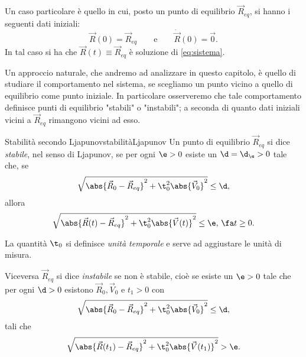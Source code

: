 \begin{ese}
	Un caso particolare è quello in cui, posto un punto di equilibrio \(\vec{R}_{eq}\), si hanno i seguenti dati iniziali:
	\[
		\vec{R}(0) = \vec{R}_{eq} \qquad\text{e}\qquad \dot{\vec{R}}(0) = \vec{0}.
	\]
	In tal caso si ha che \(\vec{R}(t) \equiv \vec{R}_{eq}\) è soluzione di \eqref{eq:sistema}.
\end{ese}

Un approccio naturale, che andremo ad analizzare in questo capitolo, è quello di studiare il comportamento nel sistema, se scegliamo un punto vicino a quello di equilibrio come punto iniziale.
In particolare osserveremo che tale comportamento definisce punti di equilibrio "stabili" o "instabili"; a seconda di quanto dati iniziali vicini a \(\vec{R}_{eq}\) rimangono vicini ad esso.

\begin{defn}{Stabilità secondo Ljapunov}{stabilitàLjapunov}
	Un punto di equilibrio \(\vec{R}_{eq}\) si dice \emph{stabile}, nel senso di Ljapunov, se per ogni \(\e>0\) esiste un \(\d=\d_\e>0\) tale che, se
	\[
		\sqrt{\abs{\vec{R}_0-\vec{R}_{eq}}^2 +\t_0^2\abs{\vec{V}_0}^2} \le \d,
	\]
	allora
	\[
		\sqrt{\abs{\vec{R}(t)-\vec{R}_{eq}}^2+\t_0^2\abs{\vec{V}(t)}^2} \le \e,\,\fa t \ge 0.
	\]
\end{defn}

\begin{notz}
	La quantità \(\t_0\) si definisce \emph{unità temporale} e serve ad aggiustare le unità di misura.
\end{notz}

\begin{oss}
	Viceversa \(\vec{R}_{eq}\) si dice \emph{instabile} se non è stabile, cioè se esiste un \(\e>0\) tale che per ogni \(\d>0\) esistono \(\vec{R}_0,\vec{V}_0\) e \(t_1>0\) con
	\[
		\sqrt{\abs{\vec{R}_0-\vec{R}_{eq}}^2 +\t_0^2\abs{\vec{V}_0}^2} \le \d,
	\]
	tali che
	\[
		\sqrt{\abs{\vec{R}(t_1)-\vec{R}_{eq}}^2+\t_0^2\abs{\vec{V}(t_1)}^2} > \e.
	\]
\end{oss}

